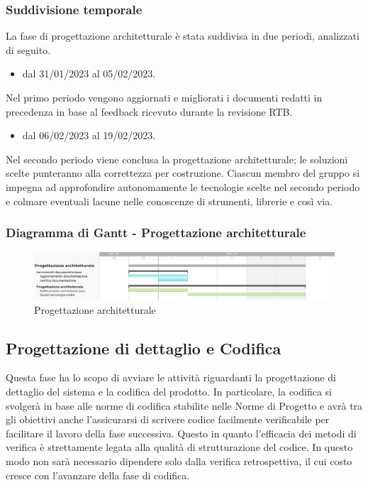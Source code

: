 \subsubsection{Suddivisione temporale}
La fase di progettazione architetturale è stata suddivisa in due periodi, analizzati di seguito.

\begin{itemize}
	\item dal 31/01/2023 al 05/02/2023.
\end{itemize}
Nel primo periodo vengono aggiornati e migliorati i documenti redatti in precedenza in base al feedback ricevuto durante la revisione RTB.

\begin{itemize}
	\item dal 06/02/2023 al 19/02/2023.
\end{itemize}
Nel secondo periodo viene conclusa la progettazione architetturale; le soluzioni scelte punteranno alla correttezza per costruzione. Ciascun membro del gruppo si impegna ad approfondire autonomamente le tecnologie scelte nel secondo periodo e colmare eventuali lacune nelle conoscenze di strumenti, librerie e così via.

\subsubsection{Diagramma di Gantt - Progettazione architetturale}

\begin{figure}[H]
\centering
\includegraphics[width=\textwidth]{img/4_progettazione.png}
\caption{Progettazione architetturale}
\end{figure}

\subsection{Progettazione di dettaglio e Codifica}
Questa fase ha lo scopo di avviare le attività riguardanti la progettazione di dettaglio del sistema e la codifica del prodotto.
In particolare, la codifica si svolgerà in base alle norme di codifica stabilite nelle Norme di Progetto e avrà tra gli obiettivi anche l’assicurarsi di scrivere codice facilmente verificabile per facilitare il lavoro della fase successiva. Questo in quanto l'efficacia dei metodi di verifica è strettamente legata alla qualità di strutturazione del codice. In questo modo non sarà necessario dipendere solo dalla verifica retrospettiva, il cui costo cresce con l'avanzare della fase di codifica.

